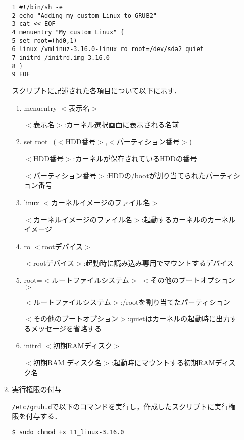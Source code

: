 \documentclass[12pt]{jsarticle}
\begin{document}
\begin{enumerate}
\begin{enumerate}
\begin{verbatim}
1 #!/bin/sh -e
2 echo "Adding my custom Linux to GRUB2"
3 cat << EOF
4 menuentry "My custom Linux" {
5 set root=(hd0,1)
6 linux /vmlinuz-3.16.0-linux ro root=/dev/sda2 quiet
7 initrd /initrd.img-3.16.0
8 }
9 EOF
\end{verbatim}

スクリプトに記述された各項目について以下に示す．
\begin{enumerate}
\item menuentry $<$表示名$>$

    $<$表示名$>$:カーネル選択画面に表示される名前

\item set root=($<$HDD番号$>$,$<$パーティション番号$>$)

    $<$HDD番号$>$:カーネルが保存されているHDDの番号

    $<$パーティション番号$>$:HDDの/bootが割り当てられたパーティション番号

\item linux $<$カーネルイメージのファイル名$>$

    $<$カーネルイメージのファイル名$>$:起動するカーネルのカーネルイメージ

\item ro $<$rootデバイス$>$

    $<$rootデバイス$>$:起動時に読み込み専用でマウントするデバイス

\item root=$<$ルートファイルシステム$>$ $<$その他のブートオプション$>$

    $<$ルートファイルシステム$>$:/rootを割り当てたパーティション

    $<$その他のブートオプション$>$:quietはカーネルの起動時に出力するメッセージを省略する

\item initrd $<$初期RAMディスク$>$

    $<$初期RAM ディスク名$>$:起動時にマウントする初期RAMディスク名

\end{enumerate}


\item 実行権限の付与 \label{enum:give executable}

\verb|/etc/grub.d|で以下のコマンドを実行し，作成したスクリプトに実行権限を付与する．
\begin{verbatim}
$ sudo chmod +x 11_linux-3.16.0
\end{verbatim}


\end{enumerate}
\end{enumerate}
\end{document}
